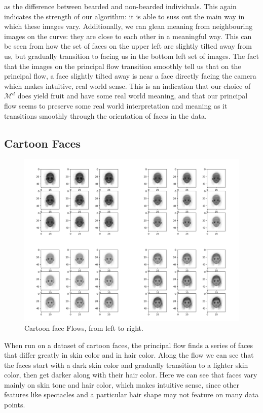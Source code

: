\documentclass[12pt]{report}
\begin{document}
as the difference between bearded and non-bearded individuals. 
This again indicates the strength of our algorithm: it is able to suss out the 
main way in which these images vary.
Additionally, we can glean meaning from neighbouring images on the curve:
they are close to each other in a meaningful way. This can be seen from how the set 
of faces on the upper left are slightly tilted away from us, but gradually 
transition to facing us in the bottom left set of images.
The fact that the images on the principal flow
transition smoothly tell us that on the principal flow,
a face slightly tilted away is near a face directly facing
the camera which makes intuitive, real world sense.
This is an indication that our choice of $\mathcal{M}^d$ does yield fruit and
have some real world meaning, and that our principal flow seems to preserve some
real world interpretation and meaning as it transitions smoothly through the orientation
of faces in the data.

\iffalse
\subsection{Cartoon Faces}

\begin{figure}[ht]
    \begin{center}
        \includegraphics[scale=0.2]{main_cartoon_10_01.png}
        \caption{Cartoon face Flows, from left to right.}
        \label{fig:cartoonfaceflows1}
    \end{center}
\end{figure}

When run on a dataset of cartoon faces, the principal flow finds a series of 
faces that differ greatly in skin color and in hair color. Along the flow 
we can see that the faces start with a dark skin color and gradually 
transition to a lighter skin color, then get darker along with their hair color. 
Here we can see that faces vary mainly on skin tone and hair color, which makes intuitive sense, 
since other features like spectacles and a particular hair shape may not feature on many
data points.
\end{document}
